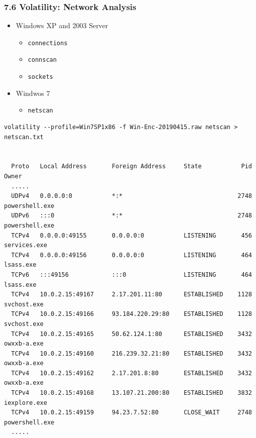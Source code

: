 \begin{frame}[fragile]
  \frametitle{7.6 Volatility: Network Analysis}
    \begin{itemize}
        \item Windows XP and 2003 Server
            \begin{itemize}
                \item \texttt{connections}
                \item \texttt{connscan}
                \item \texttt{sockets}
            \end{itemize}
        \item Windwos 7
            \begin{itemize}
                \item \texttt{netscan}
            \end{itemize}
    \end{itemize}
    \begin{lstlisting}[basicstyle=\tiny]
volatility --profile=Win7SP1x86 -f Win-Enc-20190415.raw netscan > netscan.txt


  Proto   Local Address       Foreign Address     State           Pid     Owner
  .....
  UDPv4   0.0.0.0:0           *:*                                2748     powershell.exe 
  UDPv6   :::0                *:*                                2748     powershell.exe
  TCPv4   0.0.0.0:49155       0.0.0.0:0           LISTENING       456     services.exe
  TCPv4   0.0.0.0:49156       0.0.0.0:0           LISTENING       464     lsass.exe
  TCPv6   :::49156            :::0                LISTENING       464     lsass.exe
  TCPv4   10.0.2.15:49167     2.17.201.11:80      ESTABLISHED    1128     svchost.exe
  TCPv4   10.0.2.15:49166     93.184.220.29:80    ESTABLISHED    1128     svchost.exe
  TCPv4   10.0.2.15:49165     50.62.124.1:80      ESTABLISHED    3432     owxxb-a.exe
  TCPv4   10.0.2.15:49160     216.239.32.21:80    ESTABLISHED    3432     owxxb-a.exe
  TCPv4   10.0.2.15:49162     2.17.201.8:80       ESTABLISHED    3432     owxxb-a.exe
  TCPv4   10.0.2.15:49168     13.107.21.200:80    ESTABLISHED    3832     iexplore.exe
  TCPv4   10.0.2.15:49159     94.23.7.52:80       CLOSE_WAIT     2748     powershell.exe
  .....
    \end{lstlisting}
\end{frame}


